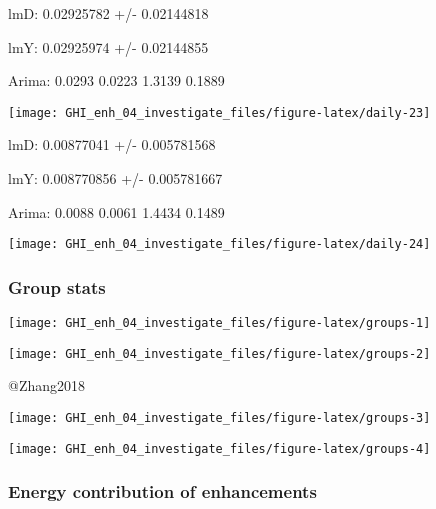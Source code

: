 \documentclass[
  10pt,
  a4paper,oneside]{article}
\begin{document}
lmD: 0.02925782 +/- 0.02144818

lmY: 0.02925974 +/- 0.02144855

Arima: 0.0293 0.0223 1.3139 0.1889

\begin{center}\texttt{[image: GHI\_enh\_04\_investigate\_files/figure-latex/daily-23]} \end{center}

lmD: 0.00877041 +/- 0.005781568

lmY: 0.008770856 +/- 0.005781667

Arima: 0.0088 0.0061 1.4434 0.1489

\begin{center}\texttt{[image: GHI\_enh\_04\_investigate\_files/figure-latex/daily-24]} \end{center}

\newpage
\FloatBarrier

\hypertarget{group-stats}{%
\subsubsection{Group stats}\label{group-stats}}

\begin{center}\texttt{[image: GHI\_enh\_04\_investigate\_files/figure-latex/groups-1]} \end{center}

\begin{center}\texttt{[image: GHI\_enh\_04\_investigate\_files/figure-latex/groups-2]} \end{center}

@Zhang2018

\begin{center}\texttt{[image: GHI\_enh\_04\_investigate\_files/figure-latex/groups-3]} \end{center}

\begin{center}\texttt{[image: GHI\_enh\_04\_investigate\_files/figure-latex/groups-4]} \end{center}

\newpage
\FloatBarrier

\hypertarget{energy-contribution-of-enhancements}{%
\subsubsection{Energy contribution of enhancements}\label{energy-contribution-of-enhancements}}
\end{document}

